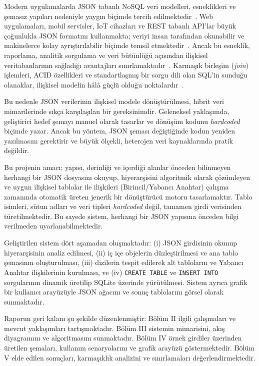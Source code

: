 \documentclass[conference,a4paper,10pt]{IEEEtran}
\begin{document}
Modern uygulamalarda JSON tabanlı NoSQL veri modelleri, esneklikleri ve şemasız yapıları nedeniyle yaygın biçimde tercih edilmektedir~\cite{nosql}. Web uygulamaları, mobil servisler, IoT cihazları ve REST tabanlı API'lar büyük çoğunlukla JSON formatını kullanmakta; veriyi insan tarafından okunabilir ve makinelerce kolay ayrıştırılabilir biçimde temsil etmektedir~\cite{json}. Ancak bu esneklik, raporlama, analitik sorgulama ve veri bütünlüğü açısından ilişkisel veritabanlarının sağladığı avantajları sınırlamaktadır~\cite{codd}. Karmaşık birleşim (\textit{join}) işlemleri, ACID özellikleri ve standartlaşmış bir sorgu dili olan SQL'in sunduğu olanaklar, ilişkisel modelin hâlâ güçlü olduğu noktalardır~\cite{date}.

Bu nedenle JSON verilerinin ilişkisel modele dönüştürülmesi, hibrit veri mimarilerinde sıkça karşılaşılan bir gereksinimdir. Geleneksel yaklaşımda, geliştirici hedef şemayı manuel olarak tasarlar ve dönüşüm kodunu \textit{hardcoded} biçimde yazar. Ancak bu yöntem, JSON şeması değiştiğinde kodun yeniden yazılmasını gerektirir ve büyük ölçekli, heterojen veri kaynaklarında pratik değildir.

Bu projenin amacı; yapısı, derinliği ve içerdiği alanlar önceden bilinmeyen herhangi bir JSON dosyasını okuyup, hiyerarşisini algoritmik olarak çözümleyen ve uygun ilişkisel tablolar ile ilişkileri (Birincil/Yabancı Anahtar) çalışma zamanında otomatik üreten jenerik bir dönüştürücü motoru tasarlamaktır. Tablo isimleri, sütun adları ve veri tipleri \textit{hardcoded} değil, tamamen girdi verisinden türetilmektedir. Bu sayede sistem, herhangi bir JSON yapısına önceden bilgi verilmeden uyarlanabilmektedir.

Geliştirilen sistem dört aşamadan oluşmaktadır: (i) JSON girdisinin okunup hiyerarşisinin analiz edilmesi, (ii) iç içe objelerin düzleştirilmesi ve ana tablo şemasının oluşturulması, (iii) dizilerin tespit edilerek alt tabloların ve Yabancı Anahtar ilişkilerinin kurulması, ve (iv) \texttt{CREATE TABLE} ve \texttt{INSERT INTO} sorgularının dinamik üretilip SQLite üzerinde yürütülmesi. Sistem ayrıca grafik bir kullanıcı arayüzüyle JSON ağacını ve sonuç tablolarını görsel olarak sunmaktadır.

Raporun geri kalanı şu şekilde düzenlenmiştir: Bölüm II ilgili çalışmaları ve mevcut yaklaşımları tartışmaktadır. Bölüm III sistemin mimarisini, akış diyagramını ve algoritmasını sunmaktadır. Bölüm IV örnek girdiler üzerinden üretilen şemaları, kullanım senaryolarını ve grafik arayüzü göstermektedir. Bölüm V elde edilen sonuçları, karmaşıklık analizini ve sınırlamaları değerlendirmektedir.
\end{document}
